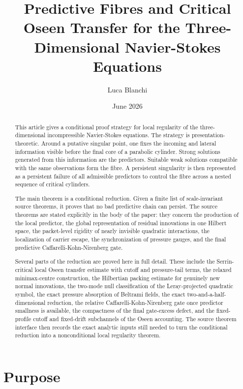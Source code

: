 \documentclass[11pt]{article}
\title{Predictive Fibres and Critical Oseen Transfer for the Three-Dimensional Navier-Stokes Equations}
\author{Luca Blanchi}
\date{June 2026}
\begin{document}
\maketitle

\begin{abstract}
This article gives a conditional proof strategy for local regularity of the
three-dimensional incompressible Navier-Stokes equations.  The strategy is
presentation-theoretic.  Around a putative singular point, one fixes the
incoming and lateral information visible before the final core of a parabolic
cylinder.  Strong solutions generated from this information are the
predictors.  Suitable weak solutions compatible with the same observations form
the fibre.  A persistent singularity is then represented as a persistent
failure of all admissible predictors to control the fibre across a nested
sequence of critical cylinders.

The main theorem is a conditional reduction.  Given a finite list of
scale-invariant source theorems, it proves that no bad predictive chain can
persist.  The source theorems are stated explicitly in the body of the paper:
they concern the production of the local predictor, the global representation of
residual innovations in one Hilbert space, the packet-level rigidity of nearly
invisible quadratic interactions, the localization of carrier escape, the
synchronization of pressure gauges, and the final predictive
Caffarelli-Kohn-Nirenberg gate.

Several parts of the reduction are proved here in full detail.  These include
the Serrin-critical local Oseen transfer estimate with cutoff and pressure-tail
terms, the relaxed minimax-centre construction, the Hilbertian packing estimate
for genuinely new normal innovations, the two-mode null classification of the
Leray-projected quadratic symbol, the exact pressure absorption of Beltrami
fields, the exact two-and-a-half-dimensional reduction, the relative
Caffarelli-Kohn-Nirenberg gate once predictor smallness is available, the
compactness of the final gate-excess defect, and the fixed-profile cutoff and
fixed-drift subchannels of the Oseen accounting.  The source theorem interface
then records the exact analytic inputs still needed to turn the conditional
reduction into a nonconditional local regularity theorem.
\end{abstract}

\section{Purpose}
\end{document}
